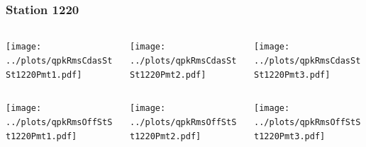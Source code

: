 \documentclass[aspectratio=169]{beamer}
\begin{document}
\begin{frame} 
  \frametitle{Station 1220}
  \begin{center}
    \begin{columns}
      \begin{column}{0.33\textwidth}
        \texttt{[image: ../plots/qpkRmsCdasStSt1220Pmt1.pdf]}
      \end{column}
      \begin{column}{0.33\textwidth}
        \texttt{[image: ../plots/qpkRmsCdasStSt1220Pmt2.pdf]}
      \end{column}
      \begin{column}{0.33\textwidth}
        \texttt{[image: ../plots/qpkRmsCdasStSt1220Pmt3.pdf]}
      \end{column}
    \end{columns}
  \end{center}

  \begin{center}
    \begin{columns}
      \begin{column}{0.33\textwidth}
        \texttt{[image: ../plots/qpkRmsOffStSt1220Pmt1.pdf]}
      \end{column}
      \begin{column}{0.33\textwidth}
        \texttt{[image: ../plots/qpkRmsOffStSt1220Pmt2.pdf]}
      \end{column}
      \begin{column}{0.33\textwidth}
        \texttt{[image: ../plots/qpkRmsOffStSt1220Pmt3.pdf]}
      \end{column}
    \end{columns}
  \end{center}
\end{frame}
\end{document}
